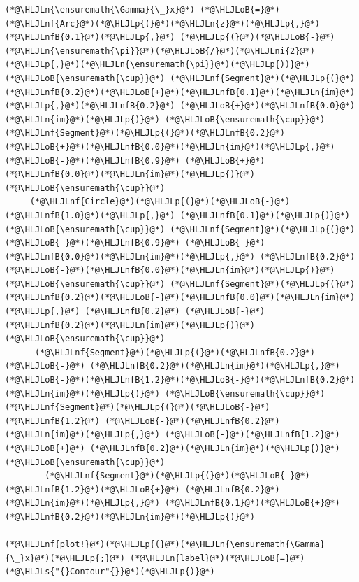 \documentclass[12pt,a4paper]{article}
\newcommand{\HLJLn}[1]{#1}
\newcommand{\HLJLnf}[1]{\textcolor[RGB]{66,102,213}{#1}}
\newcommand{\HLJLs}[1]{\textcolor[RGB]{201,61,57}{#1}}
\newcommand{\HLJLnfB}[1]{\textcolor[RGB]{59,151,46}{#1}}
\newcommand{\HLJLni}[1]{\textcolor[RGB]{59,151,46}{#1}}
\newcommand{\HLJLoB}[1]{\textcolor[RGB]{102,102,102}{\textbf{#1}}}
\newcommand{\HLJLp}[1]{#1}
\begin{document}
\begin{lstlisting}
(*@\HLJLn{\ensuremath{\Gamma}{\_}x}@*) (*@\HLJLoB{=}@*)  (*@\HLJLnf{Arc}@*)(*@\HLJLp{(}@*)(*@\HLJLn{z}@*)(*@\HLJLp{,}@*) (*@\HLJLnfB{0.1}@*)(*@\HLJLp{,}@*) (*@\HLJLp{(}@*)(*@\HLJLoB{-}@*)(*@\HLJLn{\ensuremath{\pi}}@*)(*@\HLJLoB{/}@*)(*@\HLJLni{2}@*)(*@\HLJLp{,}@*)(*@\HLJLn{\ensuremath{\pi}}@*)(*@\HLJLp{))}@*) (*@\HLJLoB{\ensuremath{\cup}}@*) (*@\HLJLnf{Segment}@*)(*@\HLJLp{(}@*)(*@\HLJLnfB{0.2}@*)(*@\HLJLoB{+}@*)(*@\HLJLnfB{0.1}@*)(*@\HLJLn{im}@*)(*@\HLJLp{,}@*)(*@\HLJLnfB{0.2}@*) (*@\HLJLoB{+}@*)(*@\HLJLnfB{0.0}@*)(*@\HLJLn{im}@*)(*@\HLJLp{)}@*) (*@\HLJLoB{\ensuremath{\cup}}@*) (*@\HLJLnf{Segment}@*)(*@\HLJLp{(}@*)(*@\HLJLnfB{0.2}@*)  (*@\HLJLoB{+}@*)(*@\HLJLnfB{0.0}@*)(*@\HLJLn{im}@*)(*@\HLJLp{,}@*) (*@\HLJLoB{-}@*)(*@\HLJLnfB{0.9}@*) (*@\HLJLoB{+}@*)(*@\HLJLnfB{0.0}@*)(*@\HLJLn{im}@*)(*@\HLJLp{)}@*) (*@\HLJLoB{\ensuremath{\cup}}@*)
     (*@\HLJLnf{Circle}@*)(*@\HLJLp{(}@*)(*@\HLJLoB{-}@*)(*@\HLJLnfB{1.0}@*)(*@\HLJLp{,}@*) (*@\HLJLnfB{0.1}@*)(*@\HLJLp{)}@*) (*@\HLJLoB{\ensuremath{\cup}}@*) (*@\HLJLnf{Segment}@*)(*@\HLJLp{(}@*)(*@\HLJLoB{-}@*)(*@\HLJLnfB{0.9}@*) (*@\HLJLoB{-}@*)(*@\HLJLnfB{0.0}@*)(*@\HLJLn{im}@*)(*@\HLJLp{,}@*) (*@\HLJLnfB{0.2}@*)  (*@\HLJLoB{-}@*)(*@\HLJLnfB{0.0}@*)(*@\HLJLn{im}@*)(*@\HLJLp{)}@*) (*@\HLJLoB{\ensuremath{\cup}}@*) (*@\HLJLnf{Segment}@*)(*@\HLJLp{(}@*)(*@\HLJLnfB{0.2}@*)(*@\HLJLoB{-}@*)(*@\HLJLnfB{0.0}@*)(*@\HLJLn{im}@*)(*@\HLJLp{,}@*) (*@\HLJLnfB{0.2}@*) (*@\HLJLoB{-}@*) (*@\HLJLnfB{0.2}@*)(*@\HLJLn{im}@*)(*@\HLJLp{)}@*) (*@\HLJLoB{\ensuremath{\cup}}@*)
      (*@\HLJLnf{Segment}@*)(*@\HLJLp{(}@*)(*@\HLJLnfB{0.2}@*) (*@\HLJLoB{-}@*) (*@\HLJLnfB{0.2}@*)(*@\HLJLn{im}@*)(*@\HLJLp{,}@*) (*@\HLJLoB{-}@*)(*@\HLJLnfB{1.2}@*)(*@\HLJLoB{-}@*)(*@\HLJLnfB{0.2}@*)(*@\HLJLn{im}@*)(*@\HLJLp{)}@*) (*@\HLJLoB{\ensuremath{\cup}}@*) (*@\HLJLnf{Segment}@*)(*@\HLJLp{(}@*)(*@\HLJLoB{-}@*)(*@\HLJLnfB{1.2}@*) (*@\HLJLoB{-}@*)(*@\HLJLnfB{0.2}@*)(*@\HLJLn{im}@*)(*@\HLJLp{,}@*) (*@\HLJLoB{-}@*)(*@\HLJLnfB{1.2}@*)(*@\HLJLoB{+}@*) (*@\HLJLnfB{0.2}@*)(*@\HLJLn{im}@*)(*@\HLJLp{)}@*) (*@\HLJLoB{\ensuremath{\cup}}@*) 
        (*@\HLJLnf{Segment}@*)(*@\HLJLp{(}@*)(*@\HLJLoB{-}@*)(*@\HLJLnfB{1.2}@*)(*@\HLJLoB{+}@*) (*@\HLJLnfB{0.2}@*)(*@\HLJLn{im}@*)(*@\HLJLp{,}@*) (*@\HLJLnfB{0.1}@*)(*@\HLJLoB{+}@*)(*@\HLJLnfB{0.2}@*)(*@\HLJLn{im}@*)(*@\HLJLp{)}@*)

(*@\HLJLnf{plot!}@*)(*@\HLJLp{(}@*)(*@\HLJLn{\ensuremath{\Gamma}{\_}x}@*)(*@\HLJLp{;}@*) (*@\HLJLn{label}@*)(*@\HLJLoB{=}@*)(*@\HLJLs{"{}Contour"{}}@*)(*@\HLJLp{)}@*)
\end{lstlisting}
\end{document}
